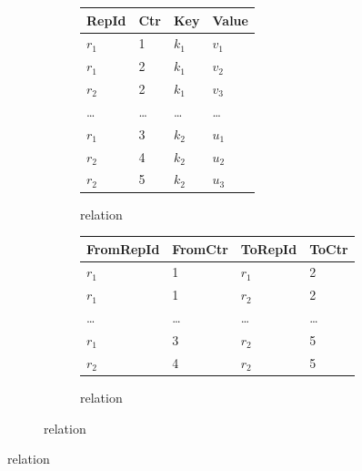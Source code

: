 \begin{figure}[htpb]
    \centering
    \small

    \begin{subfigure}[b]{\textwidth}
        \centering
        \begin{subfigure}[b]{0.45\textwidth}
            \centering
            \begin{tabular}{@{}llll@{}}
                \toprule
                RepId   & Ctr    & Key     & Value   \\
                \midrule
                \(r_1\) & 1      & \(k_1\) & \(v_1\) \\
                \(r_1\) & 2      & \(k_1\) & \(v_2\) \\
                \(r_2\) & 2      & \(k_1\) & \(v_3\) \\
                \midrule
                \ldots  & \ldots & \ldots  & \ldots  \\
                \midrule
                \(r_1\) & 3      & \(k_2\) & \(u_1\) \\
                \(r_2\) & 4      & \(k_2\) & \(u_2\) \\
                \(r_2\) & 5      & \(k_2\) & \(u_3\) \\
                \bottomrule
            \end{tabular}
            \caption{ relation}\label{fig:mvr-store-set}
        \end{subfigure}
        \hspace{1em}
        \begin{subfigure}[b]{0.45\textwidth}
            \centering
            \begin{tabular}{@{}llll@{}}
                \toprule
                FromRepId & FromCtr & ToRepId & ToCtr  \\
                \midrule
                \(r_1\)   & 1       & \(r_1\) & 2      \\
                \(r_1\)   & 1       & \(r_2\) & 2      \\
                \midrule
                \ldots    & \ldots  & \ldots  & \ldots \\
                \midrule
                \(r_1\)   & 3       & \(r_2\) & 5      \\
                \(r_2\)   & 4       & \(r_2\) & 5      \\
                \bottomrule
            \end{tabular}
            \caption{ relation}\label{fig:mvr-store-pred}
        \end{subfigure}
    \end{subfigure}


\end{figure}
